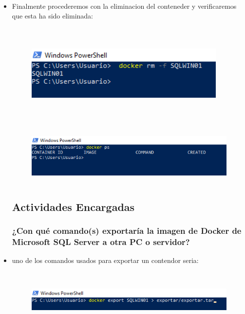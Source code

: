 \begin{itemize}
	\item Finalmente procederemos con la eliminacion del conteneder y verificaremos que esta ha sido eliminada:\\
	
	\begin{figure}[htb]
	\begin{center}
	\includegraphics[width=10cm, height=5cm]{./Imagenes/dockerrm}
	\end{center}
	\end{figure}
	
	\begin{figure}[htb]
	\begin{center}
	\includegraphics[width=12cm, height=3cm]{./Imagenes/dockerpsss}
	\end{center}
	\end{figure}
	\clearpage
	
	\subsection{Actividades Encargadas}
	
	\subsubsection{¿Con qué comando(s) exportaría la imagen de Docker de Microsoft SQL Server a otra PC o servidor?}
	
	\item uno de los comandos usados para exportar un contendor seria:
	
		\begin{figure}[htb]
	\begin{center}
	\includegraphics[width=12cm, height=3cm]{./Imagenes/tar}
	\end{center}
	\end{figure}
	

\end{itemize}
